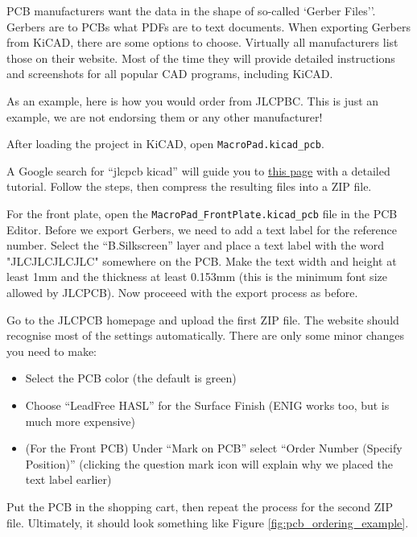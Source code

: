 \documentclass{article}
\newcommand{\file}[1]{\texttt{#1}}
\begin{document}
PCB manufacturers want the data in the shape of so-called `Gerber Files''. Gerbers are to PCBs what PDFs are to text documents. When exporting Gerbers from KiCAD, there are some options to choose. Virtually all manufacturers list those on their website. Most of the time they will provide detailed instructions and screenshots for all popular CAD programs, including KiCAD. 

As an example, here is how you would order from JLCPBC. This is just an example, we are not endorsing them or any other manufacturer! 

After loading the project in KiCAD, open \file{MacroPad.kicad\_pcb}. 

A Google search for ``jlcpcb kicad'' will guide you to \href{https://jlcpcb.com/help/article/how-to-generate-gerber-and-drill-files-in-kicad-8}{this page} with a detailed tutorial. Follow the steps, then compress the resulting files into a ZIP file. 

For the front plate, open the \file{MacroPad\_FrontPlate.kicad\_pcb} file in the PCB Editor. Before we export Gerbers, we need to add a text label for the reference number. Select the ``B.Silkscreen'' layer and place a text label with the word "JLCJLCJLCJLC" somewhere on the PCB. Make the text width and height at least 1mm and the thickness at least 0.153mm (this is the minimum font size allowed by JLCPCB). Now proceeed with the export process as before. 

Go to the JLCPCB homepage and upload the first ZIP file. The website should recognise most of the settings automatically. There are only some minor changes you need to make:
\begin{itemize}
\item Select the PCB color (the default is green)
\item Choose ``LeadFree HASL'' for the Surface Finish (ENIG works too, but is much more expensive)
\item (For the Front PCB) Under ``Mark on PCB'' select ``Order Number (Specify Position)'' (clicking the question mark icon will explain why we placed the text label earlier)
\end{itemize}

Put the PCB in the shopping cart, then repeat the process for the second ZIP file. Ultimately, it should look something like Figure \ref{fig:pcb_ordering_example}. 
\end{document}
